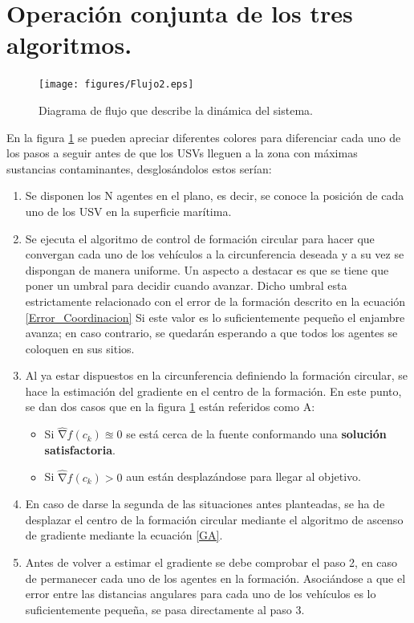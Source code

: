\section{Operación conjunta de los tres algoritmos.}

\begin{figure}[H]
\centering
\texttt{[image: figures/Flujo2.eps]}
\caption{Diagrama de flujo que describe la dinámica del sistema.} \label{fig:Flujo}
\end{figure}

En la figura \ref{fig:Flujo} se pueden apreciar diferentes colores para diferenciar cada uno de los pasos a seguir antes de que los USVs lleguen a la zona con máximas sustancias contaminantes, desglosándolos estos serían:
\newpage
\begin{enumerate}
	\item Se disponen los N agentes en el plano, es decir, se conoce la posición de cada uno de los USV en la superficie marítima.
	\item Se ejecuta el algoritmo de control de formación circular para hacer que convergan cada uno de los vehículos a la circunferencia deseada y a su vez se dispongan de manera uniforme. Un aspecto a destacar es que se tiene que poner un umbral para decidir cuando avanzar. Dicho umbral esta estrictamente relacionado con el error de la formación descrito en la ecuación \ref{Error_Coordinacion}
	Si este valor es lo suficientemente pequeño el enjambre avanza; en caso contrario, se quedarán esperando a que todos los agentes se coloquen en sus sitios. 
	\item Al ya estar dispuestos en la circunferencia definiendo la formación circular, se hace la estimación del gradiente en el centro de la formación. En este punto, se dan dos casos que en la figura \ref{fig:Flujo} están referidos como A:
	\begin{itemize}
		\item Si $\widehat{\mathrm{\nabla }}{f}\left(c_{k}\right)\approxeq0$ se está cerca de la fuente conformando una \textbf{solución satisfactoria}.
		\item Si $\widehat{\mathrm{\nabla }}{f}\left(c_{k}\right)>0$ aun están desplazándose para llegar al objetivo.
	\end{itemize}
	\item En caso de darse la segunda de las situaciones antes planteadas, se ha de desplazar el centro de la formación circular mediante el algoritmo de ascenso de gradiente mediante la ecuación \ref{GA}.
	\item Antes de volver a estimar el gradiente se debe comprobar el paso 2, en caso de permanecer cada uno de los agentes en la formación. Asociándose a que el error entre las distancias angulares para cada uno de los vehículos es lo suficientemente pequeña, se pasa directamente al paso 3.
\end{enumerate}








